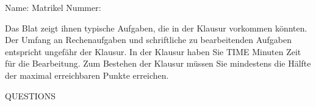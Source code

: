 \documentclass[addpoints]{exam}
\begin{document}
\vspace{0.2in}
Name:\enspace\hrulefill
\hspace{0.2in}
Matrikel Nummer:\enspace\hrulefill

\vspace{0.2in}

\begin{center}
    \centering
    Das Blat zeigt ihnen typische Aufgaben, die in der Klausur vorkommen könnten. Der Umfang an
    Rechenaufgaben und schriftliche zu bearbeitenden Aufgaben entspricht ungefähr der Klausur.
    In der Klausur haben Sie {{TIME}} Minuten Zeit für die Bearbeitung.
    Zum Bestehen der Klausur müssen Sie mindestens die Hälfte der maximal erreichbaren Punkte erreichen.
\end{center}

\vspace{0.2in}

{{QUESTIONS}}
\end{document}
